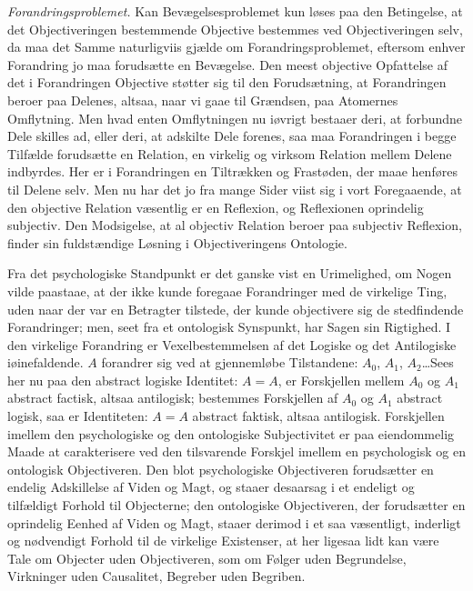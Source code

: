 \documentclass[12pt]{book}
\newcommand{\opage}[1]{\marginnote{\footnotesize\textit{[#1]}}}
\begin{document}
\emph{Forandringsproblemet.} Kan Bevægelsesproblemet kun løses paa den Betingelse, at det
Objectiveringen bestemmende Objective bestemmes ved Objectiveringen selv, da maa det Samme
naturligviis gjælde om Forandringsproblemet, eftersom enhver Forandring jo maa forudsætte en
Bevægelse. Den meest objective Opfattelse af det i Forandringen Objective støtter sig til den
Forudsætning, at Forandringen beroer paa Delenes, altsaa, naar vi gaae til Grændsen, paa
Atomernes Omflytning. Men hvad enten Omflytningen nu iøvrigt bestaaer deri, at forbundne Dele
skilles ad, eller deri, at adskilte Dele forenes, saa maa Forandringen i begge Tilfælde
forudsætte en Relation, en virkelig og virksom Relation mellem Delene indbyrdes. Her er i
Forandringen en Tiltrækken og Frastøden, der maae henføres til Delene selv. Men nu har det jo
fra mange Sider viist sig i vort Foregaaende, at den objective Relation væsentlig er en
Reflexion, og Reflexionen oprindelig subjectiv. Den Modsigelse, at al objectiv Relation beroer
paa subjectiv Reflexion, finder sin fuldstændige Løsning i Objectiveringens Ontologie.

Fra det psychologiske Standpunkt er det ganske vist en Urimelighed, om Nogen vilde paastaae, at
der ikke kunde foregaae Forandringer med de virkelige Ting, uden naar der var en Betragter
tilstede, der kunde objectivere sig de stedfindende Forandringer; men, seet fra et ontologisk
Synspunkt, har Sagen sin Rigtighed. I den virkelige Forandring er Vexelbestemmelsen af det
Logiske og det Antilogiske iøinefaldende. $A$ forandrer sig ved at gjennemløbe Tilstandene:
$A_0$, $A_1$, $A_2$\ldots Sees her nu paa den abstract logiske Identitet: $A = A$, er Forskjellen
mellem $A_0$ og $A_1$ abstract factisk, altsaa antilogisk; bestemmes Forskjellen af $A_0$ og
$A_1$ abstract logisk, saa er Identiteten: $A = A$ abstract faktisk, altsaa antilogisk.
\opage{175} Forskjellen imellem den psychologiske og den ontologiske Subjectivitet er paa eiendommelig Maade
at carakterisere ved den tilsvarende Forskjel imellem en psychologisk og en ontologisk
Objectiveren. Den blot psychologiske Objectiveren forudsætter en endelig Adskillelse af Viden og
Magt, og staaer desaarsag i et endeligt og tilfældigt Forhold til Objecterne; den ontologiske
Objectiveren, der forudsætter en oprindelig Eenhed af Viden og Magt, staaer derimod i et saa
væsentligt, inderligt og nødvendigt Forhold til de virkelige Existenser, at her ligesaa lidt kan
være Tale om Objecter uden Objectiveren, som om Følger uden Begrundelse, Virkninger uden
Causalitet, Begreber uden Begriben.
\end{document}

